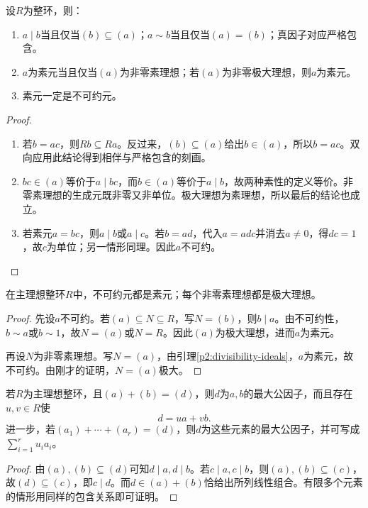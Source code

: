 \begin{lemma}\label{p2:divisibility-ideals}
设$R$为整环，则：
\begin{enumerate}
\item $a\mid b$当且仅当$(b)\subseteq(a)$；$a\sim b$当且仅当$(a)=(b)$；真因子对应严格包含。
\item $a$为素元当且仅当$(a)$为非零素理想；若$(a)$为非零极大理想，则$a$为素元。
\item 素元一定是不可约元。
\end{enumerate}
\end{lemma}
\begin{proof}
\begin{enumerate}
\item 若$b=ac$，则$Rb\subseteq Ra$。反过来，$(b)\subseteq(a)$给出$b\in(a)$，所以$b=ac$。双向应用此结论得到相伴与严格包含的刻画。
\item $bc\in(a)$等价于$a\mid bc$，而$b\in(a)$等价于$a\mid b$，故两种素性的定义等价。非零素理想的生成元既非零又非单位。极大理想为素理想，所以最后的结论也成立。
\item 若素元$a=bc$，则$a\mid b$或$a\mid c$。若$b=ad$，代入$a=adc$并消去$a\ne0$，得$dc=1$，故$c$为单位；另一情形同理。因此$a$不可约。
\end{enumerate}
\end{proof}

\begin{theorem}\label{p2:pid-primes}
在主理想整环$R$中，不可约元都是素元；每个非零素理想都是极大理想。
\end{theorem}
\begin{proof}
先设$a$不可约。若$(a)\subseteq N\subseteq R$，写$N=(b)$，则$b\mid a$。由不可约性，$b\sim a$或$b\sim1$，故$N=(a)$或$N=R$。因此$(a)$为极大理想，进而$a$为素元。

再设$N$为非零素理想。写$N=(a)$，由引理\ref{p2:divisibility-ideals}，$a$为素元，故不可约。由刚才的证明，$N=(a)$极大。
\end{proof}

\begin{theorem}\label{p2:pid-bezout}
若$R$为主理想整环，且$(a)+(b)=(d)$，则$d$为$a,b$的最大公因子，而且存在$u,v\in R$使
\[
d=ua+vb.
\]
进一步，若$(a_1)+\cdots+(a_r)=(d)$，则$d$为这些元素的最大公因子，并可写成$\sum_{i=1}^r u_i a_i$。
\end{theorem}
\begin{proof}
由$(a),(b)\subseteq(d)$可知$d\mid a,d\mid b$。若$c\mid a,c\mid b$，则$(a),(b)\subseteq(c)$，故$(d)\subseteq(c)$，即$c\mid d$。而$d\in(a)+(b)$恰给出所列线性组合。有限多个元素的情形用同样的包含关系即可证明。
\end{proof}

